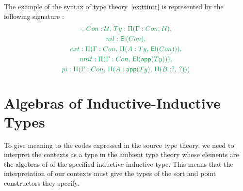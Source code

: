 \begin{example}
The example of the syntax of type theory~\ref{ex:ttintt} is represented by the
following signature :
\begin{equation*}
\begin{gathered}
\grm{\cdot,\, \mathop{Con} : \UU,\, \mathop{Ty} : \Pi(\Gamma : \mathop{Con},\, \UU),} \\
\grm{\mathop{nil} : \El(\mathop{Con}),} \\
\grm{\mathop{ext} : \Pi(\Gamma : \mathop{Con},\, \Pi(A : \mathop{Ty} ,\, \El(\mathop{Con}))),} \\
\grm{\mathop{unit} : \Pi(\Gamma : \mathop{Con},\, \El(\IIapp(\mathop{Ty}))),} \\
\grm{\mathop{pi} : \Pi(\Gamma : \mathop{Con},\, \Pi(A : \IIapp(\mathop{Ty}),\,
   \Pi(B : ?,\, ?)))} %
\end{gathered}
\end{equation*}

\end{example}

\section{Algebras of Inductive-Inductive Types}

To give meaning to the codes expressed in the source type theory, we need to
interpret the contexts as a type in the ambient type theory whose elements are
the algebras of of the specified inductive-inductive type.
This means that the interpretation of our contexts must give the types of the
sort and point constructors they specify.

